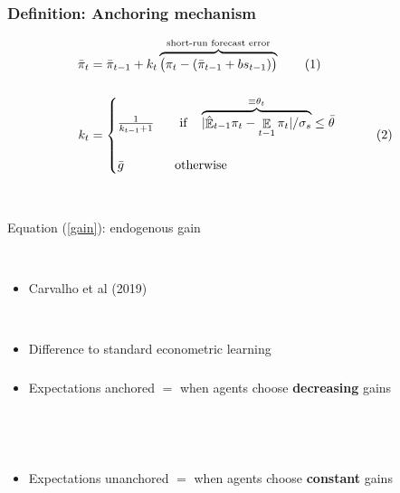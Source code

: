 \documentclass{beamer}
\DeclareMathOperator{\E}{\mathbb{E}}
\newcommand\numberthis{\addtocounter{equation}{1}\tag{\theequation}} %
\begin{document}
\begin{frame}
	\frametitle{Definition: Anchoring mechanism}
	
 \begin{align*}
\bar{\pi}_{t} & = \bar{\pi}_{t-1} +k_t\overbrace{\big(\pi_{t} -(\bar{\pi}_{t-1}+bs_{t-1}) \big)}^{\text{short-run forecast error}}  \label{RLS_anchoring} \numberthis \\
\\
k_t &= \begin{cases}  \frac{1}{k_{t-1} +1} \quad \quad \text{if} \quad \overbrace{|\hat{\E}_{t-1}\pi_t - \E_{t-1}\pi_t| / \sigma_s}^{\equiv \theta_t} \leq \bar{\theta} \\ \\\bar{g} \quad \quad \quad \quad \text{otherwise}\end{cases} \label{gain} \numberthis
\end{align*}

\

Equation (\ref{gain}): endogenous gain

\

\begin{itemize}
\item Carvalho et al (2019)

\

\item Difference to standard econometric learning
\end{itemize}


\end{frame}

\begin{frame}
	\frametitle{}
	
	


\begin{itemize}
\item Expectations anchored $ = $ when agents choose \textbf{decreasing} gains

\

\

\item Expectations unanchored $ = $ when agents choose \textbf{constant} gains
\end{itemize}



\end{frame}
\end{document}
